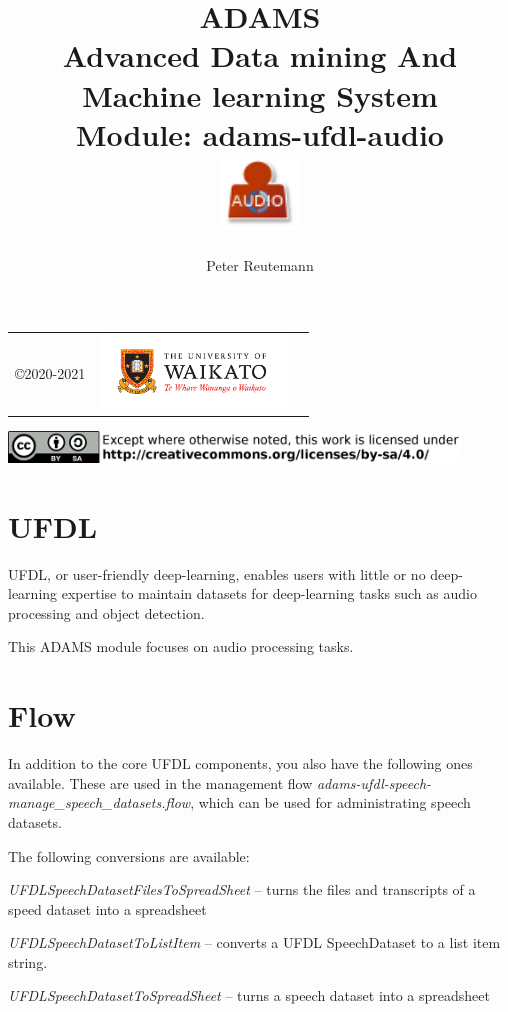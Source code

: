 \documentclass[a4paper]{book}
\title{
  \textbf{ADAMS} \\
  {\Large \textbf{A}dvanced \textbf{D}ata mining \textbf{A}nd \textbf{M}achine
  learning \textbf{S}ystem} \\
  {\Large Module: adams-ufdl-audio} \\
  \vspace{1cm}
  \includegraphics[width=2cm]{images/ufdl-audio-module.png} \\
}
\author{
  Peter Reutemann
}
\begin{document}
\begin{titlepage}
\maketitle

\thispagestyle{empty}
\center
\begin{table}[b]
	\begin{tabular}{c l l}
		\parbox[c][2cm]{2cm}{\copyright 2020-2021} &
		\parbox[c][2cm]{5cm}{\includegraphics[width=5cm]{images/coat_of_arms.pdf}} \\
	\end{tabular}
	\includegraphics[width=12cm]{images/cc.png} \\
\end{table}

\end{titlepage}

\tableofcontents

\chapter{UFDL}
UFDL, or user-friendly deep-learning, enables users with little or no deep-learning
expertise to maintain datasets for deep-learning tasks such as audio processing
and object detection.

This ADAMS module focuses on audio processing tasks.

\chapter{Flow}

In addition to the core UFDL components, you also have the following ones available.
These are used in the management flow \textit{adams-ufdl-speech-manage\_speech\_datasets.flow},
which can be used for administrating speech datasets.

The following conversions are available:
\begin{tight_itemize}
  \item \textit{UFDLSpeechDatasetFilesToSpreadSheet} -- turns the files and transcripts of a speed dataset into a spreadsheet
  \item \textit{UFDLSpeechDatasetToListItem} -- converts a UFDL SpeechDataset to a list item string.
  \item \textit{UFDLSpeechDatasetToSpreadSheet} -- turns a speech dataset into a spreadsheet
\end{tight_itemize}
\end{document}

